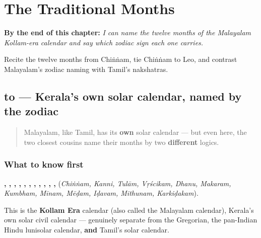 
\chapter{The Traditional Months}
\label{ch:ml-traditional-months}

\begin{chapteropening}
\textbf{By the end of this chapter:} \emph{I can name the twelve months of the Malayalam Kollam-era calendar and say which zodiac sign each one carries.}

Recite the twelve months from Chiṅṅam, tie Chiṅṅam to Leo, and contrast Malayalam's zodiac naming with Tamil's nakshatras.
\end{chapteropening}

\section[\texorpdfstring{\ml{ചിങ്ങം} \ml{കന്നി} \ml{തുലാം} … (ciṅṅaṁ kanni …)}{ചിങ്ങം കന്നി തുലാം … (ciṅṅaṁ kanni …)}]{ to  — Kerala's own solar calendar, named by the zodiac}

\label{lesson:ML-C16-kollavarsham-maasangal}



\begin{quote}
Malayalam, like Tamil, has its \textbf{own} solar calendar — but even here, the two closest cousins name their months by two \textbf{different} logics.
\end{quote}

\subsection*{What to know first}
\textbf{, , , , , , , , , , , } (\emph{Chiṅṅam, Kanni, Tulām, Vṛścikam, Dhanu, Makaram, Kumbham, Mīnam, Mēḍam, Iḍavam, Mithunam, Karkiḍakam}).

This is the \textbf{Kollam Era} calendar (also called the Malayalam calendar), Kerala's own solar civil calendar — genuinely separate from the Gregorian, the pan-Indian Hindu lunisolar calendar, \textbf{and} Tamil's solar calendar.

